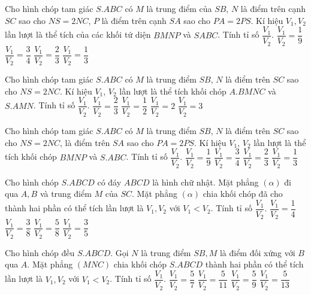 \begin{ex}%
	Cho hình chóp tam giác $S.ABC$ có $M$ là trung điểm của $SB$, $N$ là điểm trên cạnh $SC$ sao cho $NS=2NC$, $P$ là điểm trên cạnh $SA$ sao cho $PA=2PS$. Kí hiệu $V_1,V_2$ lần lượt là thể tích của các khối tứ diện $BMNP$ và $SABC$. Tính tỉ số $\dfrac{V_1}{V_2}$. 
	\choice
	{\True $\dfrac{V_1}{V_2}=\dfrac{1}{9}$}
	{$\dfrac{V_1}{V_2}=\dfrac{3}{4}$}
	{$\dfrac{V_1}{V_2}=\dfrac{2}{3}$}
	{$\dfrac{V_1}{V_2}=\dfrac{1}{3}$}
\end{ex}

\begin{ex}%
	Cho hình chóp tam giác $S.ABC$ có $M$ là trung điểm $SB$, $N$ là điểm trên $SC$ sao cho $NS=2NC$. Kí hiệu $V_1$, $V_2$ lần lượt là thể tích khối chóp $A.BMNC$ và $S.AMN$. Tính tỉ số $\dfrac{V_1}{V_2}$. 
	\choice
	{$\dfrac{V_1}{V_2}=\dfrac{2}{3}$}
	{$\dfrac{V_1}{V_2}=\dfrac{1}{2}$}
	{\True $\dfrac{V_1}{V_2}=2$}
	{$\dfrac{V_1}{V_2}=3$}
\end{ex}

\begin{ex}%
	Cho hình chóp tam giác $S.ABC$ có $M$ là trung điểm $SB$, $N$ là điểm trên $SC$ sao cho $NS=2NC$, là điểm trên $SA$ sao cho $PA=2PS$. Kí hiệu $V_1$, $V_2$ lần lượt là thể tích khối chóp $BMNP$ và $S.ABC$. Tính tỉ số $\dfrac{V_1}{V_2}$. 
	\choice
	{\True $\dfrac{V_1}{V_2}=\dfrac{1}{9}$}
	{$\dfrac{V_1}{V_2}=\dfrac{3}{4}$}
	{$\dfrac{V_1}{V_2}=\dfrac{2}{3}$}
	{$\dfrac{V_1}{V_2}=\dfrac{1}{3}$}
\end{ex}

\begin{ex}%
	Cho hình chóp $S.ABCD$ có đáy $ABCD$ là hình chữ nhật. Mặt phẳng $(\alpha)$ đi qua $A, B$ và trung điểm $M$ của $SC$. Mặt phẳng $(\alpha)$ chia khối chóp đã cho thành hai phần có thể tích lần lượt là $V_1, V_2$ với $V_1<V_2$. Tính tỉ số $\dfrac{V_1}{V_2}$. 
	\choice
	{$\dfrac{V_1}{V_2}=\dfrac{1}{4}$}
	{$\dfrac{V_1}{V_2}=\dfrac{3}{8}$}
	{$\dfrac{V_1}{V_2}=\dfrac{5}{8}$}
	{\True $\dfrac{V_1}{V_2}=\dfrac{3}{5}$}
\end{ex}

\begin{ex}%
	Cho hình chóp đều $S.ABCD$. Gọi $N$ là trung điểm $SB, M$ là điểm đối xứng với $B$ qua $A$. Mặt phẳng $(MNC)$ chia khối chóp $S.ABCD$ thành hai phần có thể tích lần lượt là $V_1, V_2$ với $V_1<V_2$. Tính tỉ số $\dfrac{V_1}{V_2}$. 
	\choice
	{\True $\dfrac{V_1}{V_2}=\dfrac{5}{7}$}
	{$\dfrac{V_1}{V_2}=\dfrac{5}{11}$}
	{$\dfrac{V_1}{V_2}=\dfrac{5}{9}$}
	{$\dfrac{V_1}{V_2}=\dfrac{5}{13}$}
\end{ex}

